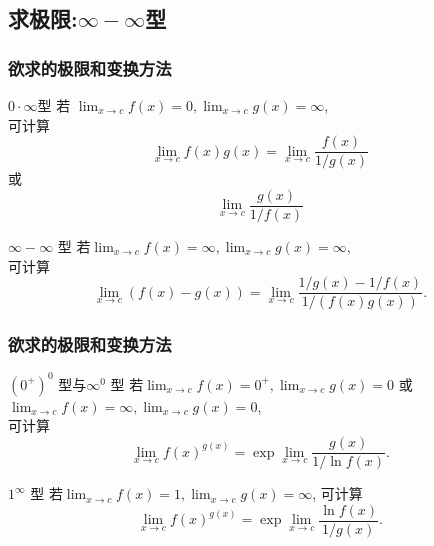 \documentclass[
10pt,
aspectratio=43,
]{beamer}
\begin{document}
\subsection{求极限:$\displaystyle\infty-\infty$型}
\begin{frame} \frametitle{欲求的极限和变换方法}
	\everymath{\displaystyle}
	\begin{block}{$0\cdot\infty$型} 
		若 $\lim _{x \rightarrow c} f(x)=0, \lim _{x \rightarrow c} g(x)=\infty$, \\
		可计算
		$$\lim _{x \rightarrow c} f(x) g(x)=\lim _{x \rightarrow c} \frac{f(x)}{1 / g(x)}$$ 或 $$\lim _{x \rightarrow c} \frac{g(x)}{1 / f(x)}$$
	\end{block}
\pause
	\begin{block}{$\infty-\infty$ 型}
		若$\lim _{x \rightarrow c} f(x)=\infty, \lim _{x \rightarrow c} g(x)=\infty$, \\
		可计算$$\lim _{x \rightarrow c}(f(x)-g(x))=\lim _{x \rightarrow c} \frac{1 / g(x)-1 / f(x)}{1 /(f(x) g(x))}.$$
	\end{block}

\end{frame}

\begin{frame} \frametitle{欲求的极限和变换方法}
	\everymath{\displaystyle}
	\begin{block}{$(0^+)^0$ 型与$\infty^0$ 型} 
		若$\lim _{x \rightarrow c} f(x)=0^{+}, \lim _{x \rightarrow c} g(x)=0$ 或 $\lim _{x \rightarrow c} f(x)=\infty, \lim _{x \rightarrow c} g(x)=0$, \\
		可计算$$\lim _{x \rightarrow c} f(x)^{g(x)}=\exp \lim _{x \rightarrow c} \frac{g(x)}{1 / \ln f(x)}.$$
	\end{block}
\pause
	\begin{block}{$1^\infty$ 型} 
		若$\lim _{x \rightarrow c} f(x)=1, \lim _{x \rightarrow c} g(x)=\infty$, 可计算 \\
		$$\lim _{x \rightarrow c} f(x)^{g(x)}=\exp \lim _{x \rightarrow c} \frac{\ln f(x)}{1 / g(x)}.$$
	\end{block}
\end{frame}
\end{document}
